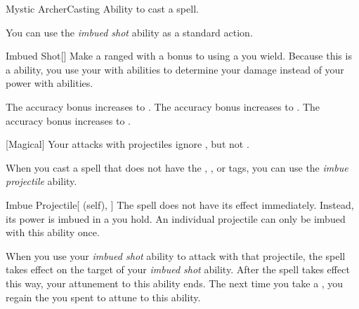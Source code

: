     \begin{feat}{Mystic Archer}{Casting}
        \featpre Ability to cast a spell.

         You can use the \textit{imbued shot} ability as a standard action.
        \begin{freeability}{Imbued Shot}[]
            Make a ranged  with a  bonus to  using a  you wield.
            Because this is a  ability, you use your  with  abilities to determine your damage instead of your power with  abilities.

            \rankline
             The accuracy bonus increases to .
             The accuracy bonus increases to .
             The accuracy bonus increases to .
        \end{freeability}

        [Magical] Your attacks with projectiles ignore , but not .

         When you cast a spell that does not have the , , or  tags,
            you can use the \textit{imbue projectile} ability.
        \begin{attuneability}{Imbue Projectile}[ (self), ]
            The spell does not have its effect immediately.
            Instead, its power is imbued in a  you hold.
            An individual projectile can only be imbued with this ability once.

            When you use your \textit{imbued shot} ability to attack with that projectile, the spell takes effect on the target of your \textit{imbued shot} ability.
            After the spell takes effect this way, your attunement to this ability ends.
            The next time you take a , you regain the  you spent to attune to this ability.
        \end{attuneability}



\end{feat}

